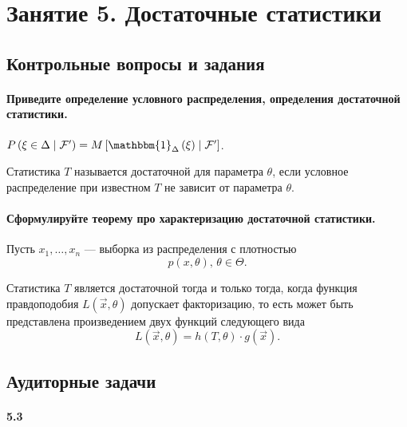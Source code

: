 \chapter*{Занятие 5. Достаточные статистики}

\section*{Контрольные вопросы и задания}

\subsubsection*{Приведите определение условного распределения, определения достаточной статистики.}

$P \left( \xi \in \Delta \; \middle| \; \mathcal{F'} \right) =
  M \left[ \mathbbm{1}_{ \Delta } \left( \xi \right) \; \middle| \; \mathcal{F'} \right] $.

Статистика $T$ называется достаточной для параметра $ \theta $,
если условное распределение при известном $T$ не зависит от параметра $ \theta $.

\subsubsection*{Сформулируйте теорему про характеризацию достаточной статистики.}

Пусть $x_1, \dotsc, x_n$ ---
выборка из распределения с плотностью
$$p \left( x, \theta \right), \,
  \theta \in \Theta.$$

Статистика $T$ является достаточной тогда и только тогда,
когда функция правдоподобия $L \left( \vec{x}, \theta \right) $ допускает факторизацию,
то есть может быть представлена произведением двух функций следующего вида
$$L \left( \vec{x}, \theta \right) =
  h \left( T, \theta \right) \cdot g \left( \vec{x} \right).$$

\section*{Аудиторные задачи}

\subsubsection{5.3}

